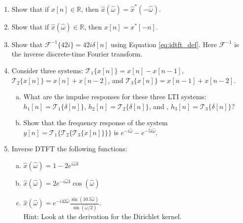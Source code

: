 \begin{enumerate} 
\item Show that if $x[n] \in \mathbb{R}$, then $\hat{x}(\hat{\omega}) = \hat{x}^*(-\hat{\omega})$.
\item Show that if $\hat{x}(\hat{\omega}) \in \mathbb{R}$, then $x[n]=x^*[-n]$.

\item Show that $\mathcal{F}^{-1}\{42 i\}=42i\delta[n]$ using Equation \ref{eq:idtft_def}. Here $\mathcal{F}^{-1}$ is the inverse discrete-time Fourier transform.
\item Consider three systems: $\mathcal{T}_1\{x[n]\} = x[n]-x[n-1]$,  $\mathcal{T}_2\{x[n]\} = x[n]+x[n-2]$, and 
 $\mathcal{T}_3\{x[n]\} = x[n-1]+x[n-2]$.
 \begin{enumerate}[a)]
 \item What are the impulse responses for these three LTI systems: $h_1[n]=\mathcal{T}_1\{\delta[n]\}$, $h_2[n]=\mathcal{T}_2\{\delta[n]\}$, and ,  $h_3[n]=\mathcal{T}_3\{\delta[n]\}$?
 \item Show that the frequency response of the system $y[n]=\mathcal{T}_1\{\mathcal{T}_2\{\mathcal{T}_3\{x[n]\}\}\}$ is $e^{-i\hat{\omega}}-e^{-5i\hat{\omega}}$.
 \end{enumerate}      
 \item Inverse DTFT the following functions:
 \begin{enumerate}[a)]
 \item $\hat{x}(\hat{\omega})=1-2e^{i\hat{\omega}3}$
 \item $\hat{x}(\hat{\omega})=2e^{-i\hat{\omega}3}\cos(\hat{\omega})$
 \item $\hat{x}(\hat{\omega})=e^{-i 42 \hat{\omega}} \frac{\sin(10.5 \hat{\omega})}{\sin(\hat{\omega}/2)}$.\\
 Hint: Look at the derivation for the Dirichlet kernel.
\end{enumerate}

\end{enumerate}

